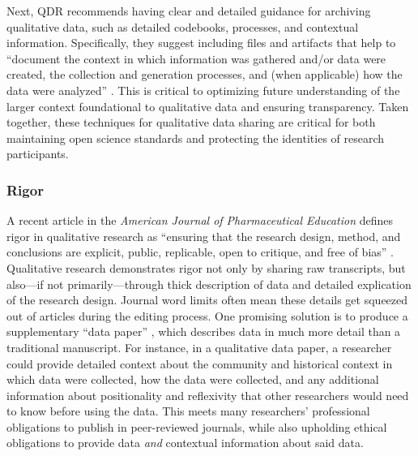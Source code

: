 \documentclass[authordate, meta]{jote-new-article}
\begin{document}
Next, QDR recommends having clear and detailed guidance for archiving qualitative data, such as detailed codebooks, processes, and contextual information. Specifically, they suggest including files and artifacts that help to “document the context in which information was gathered and/or data were created, the collection and generation processes, and (when applicable) how the data were analyzed” \parencites[Documentation Files section]{QualitativeDataRepositoryND}. This is critical to optimizing future understanding of the larger context foundational to qualitative data and ensuring transparency. Taken together, these techniques for qualitative data sharing are critical for both maintaining open science standards and protecting the identities of research participants.



\subsubsection{Rigor}



A recent article in the \emph{American Journal of Pharmaceutical Education} defines rigor in qualitative research as “ensuring that the research design, method, and conclusions are explicit, public, replicable, open to critique, and free of bias” \parencites{Johnson2020}. Qualitative research demonstrates rigor not only by sharing raw transcripts, but also—if not primarily—through thick description of data and detailed explication of the research design. Journal word limits often mean these details get squeezed out of articles during the editing process. One promising solution is to produce a supplementary “data paper” \parencites{Schöpfel2019}, which describes data in much more detail than a traditional manuscript. For instance, in a qualitative data paper, a researcher could provide detailed context about the community and historical context in which data were collected, how the data were collected, and any additional information about positionality and reflexivity that other researchers would need to know before using the data. This meets many researchers’ professional obligations to publish in peer-reviewed journals, while also upholding ethical obligations to provide data \emph{and }contextual information about said data.
\end{document}
